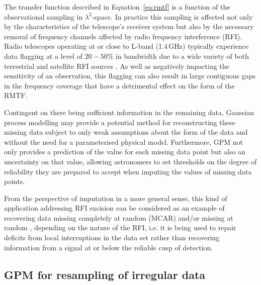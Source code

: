 \documentclass[fleqn,usenatbib]{mnras}
\begin{document}
The transfer function described in Equation~\ref{eq:rmtf} is a function of the observational sampling in $\lambda^2$-space. In practice this sampling is affected not only by the characteristics of the telescope's receiver system but also by the necessary removal of frequency channels affected by radio frequency interference (RFI). Radio telescopes operating at or close to L-band (1.4\,GHz) typically experience data flagging at a level of $20-50\%$ in bandwidth due to a wide variety of both terrestrial and satellite RFI sources \citep[e.g.][]{deep2}. As well as negatively impacting the sensitivity of an observation, this flagging can also result in large contiguous gaps in the frequency coverage that have a detrimental effect on the form of the RMTF.

Contingent on there being sufficient information in the remaining data, Gaussian process modelling may provide a potential method for reconstructing these missing data subject to only weak assumptions about the form of the data and without the need for a parameterised physical model. Furthermore, GPM not only provides a prediction of the value for each missing data point but also an uncertainty on that value, allowing astronomers to set thresholds on the degree of reliability they are prepared to accept when imputing the values of missing data points. 

From the perspective of imputation in a more general sense, this kind of application addressing RFI excision can be considered as an example of recovering data missing completely at random (MCAR) and/or missing at random \citep[MAR; e.g.][]{MAR}, depending on the nature of the RFI, i.e. it is being used to repair deficits from local interruptions in the data set rather than recovering information from a signal at or below the reliable cusp of detection.

\subsection{GPM for resampling of irregular data}
\label{sec:resampling}
\end{document}
